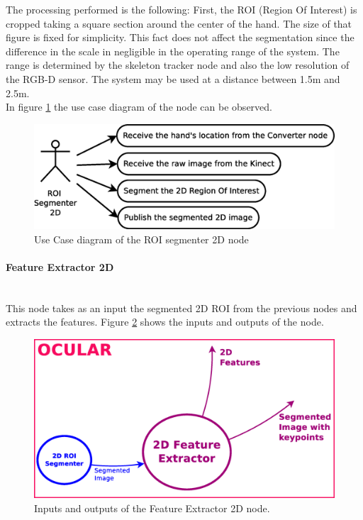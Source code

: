 	The processing performed is the following: First, the ROI (Region Of Interest) is cropped taking a square section around the center of the hand. 
	The size of that figure is fixed for simplicity. 
	This fact does not affect the segmentation since the difference in the scale in negligible in the operating range of the system. 
	The range is determined by the skeleton tracker node and also the low resolution of the RGB-D sensor. 
	The system may be used at a distance between 1.5m and 2.5m. 
	\\
	In figure \ref{uc_roi2d} the use case diagram of the node can be observed.
	\begin{figure}[H]
		\centering
			\includegraphics[scale=0.4]{img/diagrams/uc_roi_segmenter_2d.eps}
			\caption[Use case diagram ROI segmenter 2D node]{Use Case diagram of the ROI segmenter 2D node}
		\label{uc_roi2d}
	\end{figure}

\newpage

\paragraph{Feature Extractor 2D}\mbox{}\\

	This node takes as an input the segmented 2D ROI from the previous nodes and extracts the features. 
	Figure \ref{node_fe2d} shows the inputs and outputs of the node. 

		\begin{figure}[H]
			\begin{center}
			\includegraphics[width=0.5\linewidth]{img/diagrams/node_fe2d.eps}
			\caption[Feature Extractor 2D node I/O]{Inputs and outputs of the Feature Extractor 2D node.}		
			\label{node_fe2d}
			\end{center}
		\end{figure}

